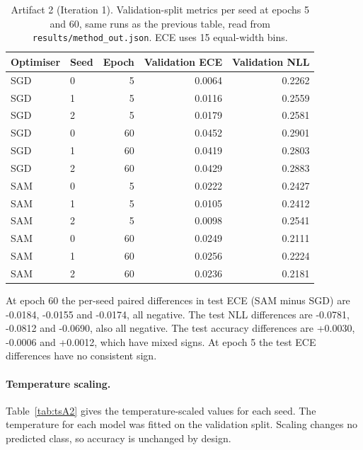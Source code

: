 \documentclass[11pt,letterpaper]{article}
\begin{document}
\begin{table}[!htbp]
\centering
\footnotesize
\caption{Artifact 2 (Iteration 1). Validation-split metrics per seed at epochs 5 and 60, same runs as the previous table, read from \texttt{results/method\_out.json}. ECE uses 15 equal-width bins.}
\label{tab:perseedB}
\begin{tabular}{llrrr}
\toprule
Optimiser & Seed & Epoch & Validation ECE & Validation NLL \\
\midrule
SGD & 0 & 5 & 0.0064 & 0.2262 \\
SGD & 1 & 5 & 0.0116 & 0.2559 \\
SGD & 2 & 5 & 0.0179 & 0.2581 \\
SGD & 0 & 60 & 0.0452 & 0.2901 \\
SGD & 1 & 60 & 0.0419 & 0.2803 \\
SGD & 2 & 60 & 0.0429 & 0.2883 \\
SAM & 0 & 5 & 0.0222 & 0.2427 \\
SAM & 1 & 5 & 0.0105 & 0.2412 \\
SAM & 2 & 5 & 0.0098 & 0.2541 \\
SAM & 0 & 60 & 0.0249 & 0.2111 \\
SAM & 1 & 60 & 0.0256 & 0.2224 \\
SAM & 2 & 60 & 0.0236 & 0.2181 \\
\bottomrule
\end{tabular}
\end{table}

At epoch 60 the per-seed paired differences in test ECE (SAM minus SGD) are -0.0184, -0.0155 and -0.0174, all negative. The test NLL differences are -0.0781, -0.0812 and -0.0690, also all negative. The test accuracy differences are +0.0030, -0.0006 and +0.0012, which have mixed signs. At epoch 5 the test ECE differences have no consistent sign.

\paragraph{Temperature scaling.} Table~\ref{tab:tsA2} gives the temperature-scaled values for each seed. The temperature for each model was fitted on the validation split. Scaling changes no predicted class, so accuracy is unchanged by design.
\end{document}
